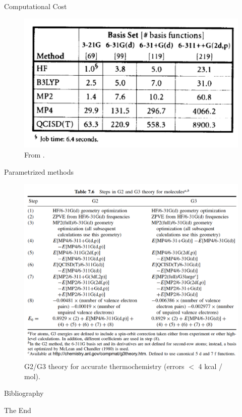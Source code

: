 \documentclass[aspectratio=169]{beamer}
\begin{document}
\begin{frame}{Computational Cost}
    \begin{figure}
        \centering
        \includegraphics[width=0.65\linewidth]{lectures/figures/3_compute_cost.png}
        \caption{From \cite{foresmanExploringChemistryElectronic1996}.}
    \end{figure}
\end{frame}

\begin{frame}{Parametrized methods}
    \begin{figure}
        \centering
        \includegraphics[width=0.5\linewidth]{lectures/figures/3_G2_G3.png}
        \caption{G2/G3 theory for accurate thermochemistry (errors $<$ 4 kcal / mol).}
    \end{figure}
\end{frame}

\begin{frame}[allowframebreaks]{Bibliography}
    
    
\end{frame}



\begin{frame}
    \Huge{\centerline{The End}}
\end{frame}
\end{document}
